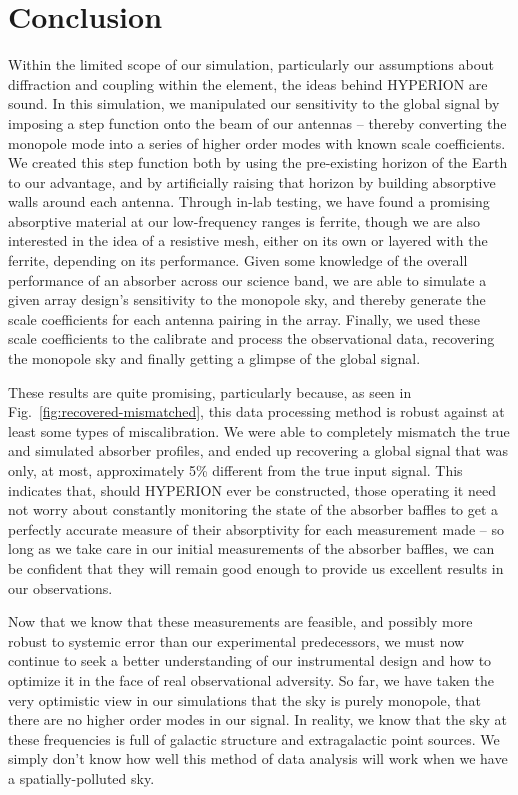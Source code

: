 \chapter{Conclusion}

Within the limited scope of our simulation, particularly our assumptions about 
diffraction and coupling within the element, the ideas behind HYPERION are 
sound.  In this simulation, we manipulated our sensitivity to the global signal 
by imposing a step function onto the beam of our antennas -- thereby converting 
the monopole mode into a series of higher order modes with known scale 
coefficients. We created this step function both by using the pre-existing 
horizon of the Earth to our advantage, and by artificially raising that horizon 
by building absorptive walls around each antenna. Through in-lab testing, we 
have found a promising absorptive material at our low-frequency ranges is 
ferrite, though we are also interested in the idea of a resistive mesh, either 
on its own or layered with the ferrite, depending on its performance. Given 
some knowledge of the  overall performance of an absorber across our science 
band, we are able to simulate a given array design's sensitivity to the 
monopole sky, and thereby generate the scale coefficients for each antenna 
pairing in the array.  Finally, we used these scale coefficients to the 
calibrate and process the observational data, recovering the monopole sky and 
finally getting a glimpse of the global signal.

These results are quite promising, particularly because, as seen in 
Fig.~\ref{fig:recovered-mismatched}, this data processing method is robust 
against at least some types of miscalibration. We were able to completely 
mismatch the true and simulated absorber profiles, and ended up recovering a 
global signal that was only, at most, approximately 5\% different from the true 
input signal. This indicates that, should HYPERION ever be constructed, those 
operating it need not worry about constantly monitoring the state of the 
absorber baffles to get a perfectly accurate measure of their absorptivity for 
each measurement made -- so long as we take care in our initial measurements of 
the absorber baffles, we can be confident that they will remain good enough to 
provide us excellent results in our observations.

Now that we know that these measurements are feasible, and possibly more robust 
to systemic error than our experimental predecessors, we must now continue to 
seek a better understanding of our instrumental design and how to optimize it 
in the face of real observational adversity. So far, we have taken the very 
optimistic view in our simulations that the sky is purely monopole, that there 
are no higher order modes in our signal. In reality, we know that the sky at 
these frequencies is full of galactic structure and extragalactic point 
sources. We simply don't know how well this method of data analysis will work 
when we have a spatially-polluted sky.

